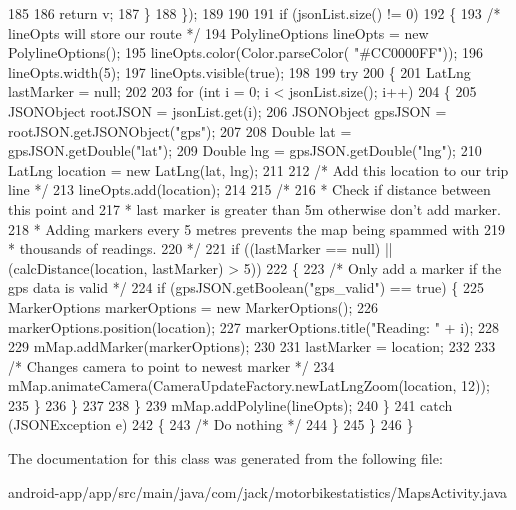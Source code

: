 \begin{DoxyCode}
185 
186                 \textcolor{keywordflow}{return} v;
187             \}
188         \});
189 
190 
191         \textcolor{keywordflow}{if} (jsonList.size() != 0)
192         \{
193             \textcolor{comment}{/* lineOpts will store our route */}
194             PolylineOptions lineOpts = \textcolor{keyword}{new} PolylineOptions();
195             lineOpts.color(Color.parseColor( \textcolor{stringliteral}{"#CC0000FF"}));
196             lineOpts.width(5);
197             lineOpts.visible(\textcolor{keyword}{true});
198 
199             \textcolor{keywordflow}{try}
200             \{
201                 LatLng lastMarker = null;
202 
203                 \textcolor{keywordflow}{for} (\textcolor{keywordtype}{int} i = 0; i < jsonList.size(); i++)
204                 \{
205                     JSONObject rootJSON = jsonList.get(i);
206                     JSONObject gpsJSON = rootJSON.getJSONObject(\textcolor{stringliteral}{"gps"});
207 
208                     Double lat = gpsJSON.getDouble(\textcolor{stringliteral}{"lat"});
209                     Double lng = gpsJSON.getDouble(\textcolor{stringliteral}{"lng"});
210                     LatLng location = \textcolor{keyword}{new} LatLng(lat, lng);
211 
212                     \textcolor{comment}{/* Add this location to our trip line */}
213                     lineOpts.add(location);
214 
215                     \textcolor{comment}{/*}
216 \textcolor{comment}{                     * Check if distance between this point and}
217 \textcolor{comment}{                     * last marker is greater than 5m otherwise don't add marker.}
218 \textcolor{comment}{                     * Adding markers every 5 metres prevents the map being spammed with}
219 \textcolor{comment}{                     * thousands of readings.}
220 \textcolor{comment}{                     */}
221                     \textcolor{keywordflow}{if} ((lastMarker == null) || (calcDistance(location, lastMarker) > 5))
222                     \{
223                         \textcolor{comment}{/* Only add a marker if the gps data is valid */}
224                         \textcolor{keywordflow}{if} (gpsJSON.getBoolean(\textcolor{stringliteral}{"gps\_valid"}) == \textcolor{keyword}{true}) \{
225                             MarkerOptions markerOptions = \textcolor{keyword}{new} MarkerOptions();
226                             markerOptions.position(location);
227                             markerOptions.title(\textcolor{stringliteral}{"Reading: "} + i);
228 
229                             mMap.addMarker(markerOptions);
230 
231                             lastMarker = location;
232 
233                             \textcolor{comment}{/* Changes camera to point to newest marker */}
234                             mMap.animateCamera(CameraUpdateFactory.newLatLngZoom(location, 12));
235                         \}
236                     \}
237 
238                 \}
239                 mMap.addPolyline(lineOpts);
240             \}
241             \textcolor{keywordflow}{catch} (JSONException e)
242             \{
243                 \textcolor{comment}{/* Do nothing */}
244             \}
245         \}
246     \}
\end{DoxyCode}


The documentation for this class was generated from the following file\+:\begin{DoxyCompactItemize}
\item 
android-\/app/app/src/main/java/com/jack/motorbikestatistics/Maps\+Activity.\+java\end{DoxyCompactItemize}
